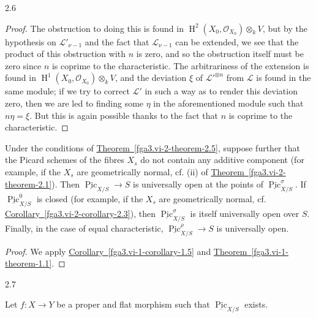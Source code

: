 \begin{lemma}{2.6}
\begin{proof}
      The obstruction to doing this is found in \(\operatorname {H}^2(X_0,\mathcal {O}_{X_0})\otimes _k V\), but by the hypothesis on \(\mathscr {L}'_{\nu -1}\) and the fact that \(\mathscr {L}_{\nu -1}\) can be extended, we see that the product of this obstruction with \(n\) is zero, and so the obstruction itself must be zero since \(n\) is coprime to the characteristic.
      The arbitrariness of the extension is found in \(\operatorname {H}^1(X_0,\mathcal {O}_{X_0})\otimes _k V\), and the deviation \(\xi \) of \({\mathscr {L}'}^{\otimes  n}\) from \(\mathscr {L}\) is found in the same module;
      if we try to correct \(\mathscr {L}'\) in such a way as to render this deviation zero, then we are led to finding some \(\eta \) in the aforementioned module such that \(n\eta =\xi \).
      But this is again possible thanks to the fact that \(n\) is coprime to the characteristic.\end{proof}\end{lemma}\begin{corollary}{}\label{fga3.vi-2-corollary}\skipsinglepar\par{}Under the conditions of \hyperref[fga3.vi-2-theorem-2.5]{Theorem~\ref*{fga3.vi-2-theorem-2.5}}, suppose further that the Picard schemes of the fibres \(X_s\) do not contain any additive component (for example, if the \(X_s\) are geometrically normal, cf. (ii) of \hyperref[fga3.vi-2-theorem-2.1]{Theorem~\ref*{fga3.vi-2-theorem-2.1}}).
    Then \(\underline {\operatorname {Pic}}_{X/S}\to  S\) is universally open at the points of \(\underline {\operatorname {Pic}}_{X/S}^\sigma \).
    If \(\underline {\operatorname {Pic}}_{X/S}^0\) is closed (for example, if the \(X_s\) are geometrically normal, cf. \hyperref[fga3.vi-2-corollary-2.3]{Corollary~\ref*{fga3.vi-2-corollary-2.3}}), then \(\underline {\operatorname {Pic}}_{X/S}^\sigma \) is itself universally open over \(S\).
    Finally, in the case of equal characteristic, \(\underline {\operatorname {Pic}}_{X/S}^\rho \to  S\) is universally open.\begin{proof}\par{}We apply \hyperref[fga3.vi-1-corollary-1.5]{Corollary~\ref*{fga3.vi-1-corollary-1.5}} and \hyperref[fga3.vi-1-theorem-1.1]{Theorem~\ref*{fga3.vi-1-theorem-1.1}}.\end{proof}\end{corollary}\begin{corollary}{2.7}\label{fga3.vi-2-corollary-2.7}\skipsinglepar\par{}Let \(f\colon  X\to  Y\) be a proper and flat morphism such that \(\underline {\operatorname {Pic}}_{X/S}\) exists.

\end{corollary}
